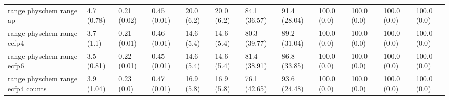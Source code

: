 \begin{tabular}{llllllllllll}
range physchem range ap & {\cellcolor[HTML]{F5FBFC}} \color[HTML]{000000} 4.7 (0.78) & {\cellcolor[HTML]{F7FCFD}} \color[HTML]{000000} 0.21 (0.02) & {\cellcolor[HTML]{78CAB1}} \color[HTML]{000000} 0.45 (0.01) & {\cellcolor[HTML]{D6F0EE}} \color[HTML]{000000} 20.0 (6.2) & {\cellcolor[HTML]{D6F0EE}} \color[HTML]{000000} 20.0 (6.2) & {\cellcolor[HTML]{097532}} \color[HTML]{F1F1F1} 84.1 (36.57) & {\cellcolor[HTML]{006027}} \color[HTML]{F1F1F1} 91.4 (28.04) & {\cellcolor[HTML]{00441B}} \color[HTML]{F1F1F1} 100.0 (0.0) & {\cellcolor[HTML]{00441B}} \color[HTML]{F1F1F1} 100.0 (0.0) & {\cellcolor[HTML]{00441B}} \color[HTML]{F1F1F1} 100.0 (0.0) & {\cellcolor[HTML]{00441B}} \color[HTML]{F1F1F1} 100.0 (0.0) \\
range physchem range ecfp4 & {\cellcolor[HTML]{F2FAFC}} \color[HTML]{000000} 3.7 (1.1) & {\cellcolor[HTML]{F5FBFD}} \color[HTML]{000000} 0.21 (0.01) & {\cellcolor[HTML]{77C9B0}} \color[HTML]{000000} 0.46 (0.01) & {\cellcolor[HTML]{E1F4F6}} \color[HTML]{000000} 14.6 (5.4) & {\cellcolor[HTML]{E1F4F6}} \color[HTML]{000000} 14.6 (5.4) & {\cellcolor[HTML]{147E3A}} \color[HTML]{F1F1F1} 80.3 (39.77) & {\cellcolor[HTML]{006729}} \color[HTML]{F1F1F1} 89.2 (31.04) & {\cellcolor[HTML]{00441B}} \color[HTML]{F1F1F1} 100.0 (0.0) & {\cellcolor[HTML]{00441B}} \color[HTML]{F1F1F1} 100.0 (0.0) & {\cellcolor[HTML]{00441B}} \color[HTML]{F1F1F1} 100.0 (0.0) & {\cellcolor[HTML]{00441B}} \color[HTML]{F1F1F1} 100.0 (0.0) \\
range physchem range ecfp6 & {\cellcolor[HTML]{F5FBFC}} \color[HTML]{000000} 3.5 (0.81) & {\cellcolor[HTML]{F7FCFD}} \color[HTML]{000000} 0.22 (0.01) & {\cellcolor[HTML]{78CAB1}} \color[HTML]{000000} 0.45 (0.01) & {\cellcolor[HTML]{E1F4F6}} \color[HTML]{000000} 14.6 (5.4) & {\cellcolor[HTML]{E1F4F6}} \color[HTML]{000000} 14.6 (5.4) & {\cellcolor[HTML]{117B38}} \color[HTML]{F1F1F1} 81.4 (38.91) & {\cellcolor[HTML]{016E2D}} \color[HTML]{F1F1F1} 86.8 (33.85) & {\cellcolor[HTML]{00441B}} \color[HTML]{F1F1F1} 100.0 (0.0) & {\cellcolor[HTML]{00441B}} \color[HTML]{F1F1F1} 100.0 (0.0) & {\cellcolor[HTML]{00441B}} \color[HTML]{F1F1F1} 100.0 (0.0) & {\cellcolor[HTML]{00441B}} \color[HTML]{F1F1F1} 100.0 (0.0) \\
range physchem range ecfp4 counts & {\cellcolor[HTML]{F2FAFC}} \color[HTML]{000000} 3.9 (1.04) & {\cellcolor[HTML]{F7FCFD}} \color[HTML]{000000} 0.23 (0.0) & {\cellcolor[HTML]{72C7AD}} \color[HTML]{000000} 0.47 (0.01) & {\cellcolor[HTML]{DCF2F2}} \color[HTML]{000000} 16.9 (5.8) & {\cellcolor[HTML]{DCF2F2}} \color[HTML]{000000} 16.9 (5.8) & {\cellcolor[HTML]{208843}} \color[HTML]{F1F1F1} 76.1 (42.65) & {\cellcolor[HTML]{005924}} \color[HTML]{F1F1F1} 93.6 (24.48) & {\cellcolor[HTML]{00441B}} \color[HTML]{F1F1F1} 100.0 (0.0) & {\cellcolor[HTML]{00441B}} \color[HTML]{F1F1F1} 100.0 (0.0) & {\cellcolor[HTML]{00441B}} \color[HTML]{F1F1F1} 100.0 (0.0) & {\cellcolor[HTML]{00441B}} \color[HTML]{F1F1F1} 100.0 (0.0) \\

\end{tabular}
